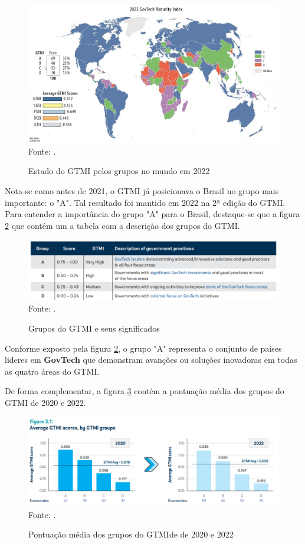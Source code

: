\begin{figure}[H]
	\centering
	\caption{Estado do GTMI pelos grupos no mundo em 2022}
	\includegraphics[width=1\linewidth]{figuras/gtmi_2022_survey_map}
	\label{fig:gtmi_2022_survey_map}
	\footnotesize{Fonte: \cite{gtmi_2022}.}
\end{figure}

Nota-se como antes de 2021, o GTMI já posicionava o Brasil no grupo mais importante: o "A". Tal resultado foi mantido em 2022 na 2ª edição do GTMI. Para entender a importância do grupo "A" para o Brasil, destaque-se que a figura \ref{fig:definicao_grupos_gtmi} que contém um a tabela com a descrição dos grupos do GTMI.

\begin{figure}[H]
	\centering
	\caption{Grupos do GTMI e seus significados}
	\includegraphics[width=1\linewidth]{figuras/definicao_grupos_gtmi}
	\label{fig:definicao_grupos_gtmi}
	\footnotesize{Fonte: \cite{gtmi_2022}.}
\end{figure}

Conforme exposto pela figura \ref{fig:definicao_grupos_gtmi}, o grupo "A" representa o conjunto de países lideres em \textbf{GovTech} que demonstram avanções ou soluções inovadoras em todas as quatro áreas do GTMI.

De forma complementar, a figura \ref{fig:avg_gtmi_scores} contém a pontuação média dos grupos do GTMI de 2020 e 2022.

\begin{figure}[H]
	\centering
	\caption{Pontuação média dos grupos do GTMIde de 2020 e 2022}
	\includegraphics[width=1\linewidth]{figuras/avg_gtmi_scores}
	\label{fig:avg_gtmi_scores}
	\footnotesize{Fonte: \cite{gtmi_2022}.}
\end{figure}

